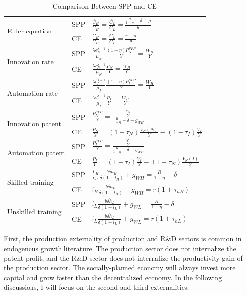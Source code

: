 \documentclass[12pt]{article}
\begin{document}
\begin{table}[h!]
\center
\renewcommand{\arraystretch}{2}
\begin{tabular}{l|ll}
\hline \hline
\multirow{2}{*}{Euler equation} & SPP  &  
$\frac{\dot{C_H}}{C_H} = \frac{\dot{C_L}}{C_L} = \frac{\frac{R}{1-\eta}-\delta-\rho}{\theta}$ \\
& CE &$\frac{\dot{C_H}}{C_H} = \frac{\dot{C_L}}{C_L} = \frac{r-\rho}{\theta}$ \\\hline
\multirow{2}{*}{Innovation rate} & SPP  &  
$\frac{\lambda\epsilon_N^{\lambda-1}}{\mu_N}\frac{(1-\eta)P_N^{SPP}}{Y} = \frac{W_H}{Y} $  \\ 
& CE &$\frac{\lambda\epsilon_N^{\lambda-1}}{\mu_N}\frac{P_N}{Y}  = \frac{W_H}{Y}$ \\\hline
\multirow{2}{*}{Automation rate}  & SPP  &  
$ \frac{\lambda\epsilon_I^{\lambda-1}}{\mu_I}\frac{(1-\eta)P_I^{SPP}}{Y}  = \frac{W_H}{Y}$  \\
& CE &$ \frac{\lambda\epsilon_I^{\lambda-1}}{\mu_I}\frac{P_I}{Y}  = \frac{W_H}{Y}$ \\\hline
\multirow{2}{*}{Innovation patent} & SPP  &  
$\frac{P_N^{SPP}}{Y} = \frac{\frac{Y_N}{Y}}{\frac{R}{1-\eta}-\delta-g_{WH}}$  \\
& CE &$\frac{P_N}{Y} =(1-\tau_N)\frac{V_N(N)}{Y}-(1-\tau_I)\frac{V_I}{Y}$ \\\hline
\multirow{2}{*}{Automation patent} & SPP  &  
$\frac{P_I^{SPP}}{Y}= \frac{\frac{Y_I}{Y}}{\frac{R}{1-\eta}-\delta-g_{WH}}$  \\
& CE &$\frac{P_I}{Y}  =  (1-\tau_I)\frac{V_I}{Y}-(1-\tau_N)\frac{V_N(I)}{Y}$ \\\hline
\multirow{2}{*}{Skilled training} & SPP  &  
$\frac{L_H}{\epsilon_H}\frac{b\delta \dot{h}_H}{\delta(1-l_H)}+g_{WH} = \frac{R}{1-\eta}-\delta$  \\ 
& CE &$l_H\frac{b\delta \dot{h}_H}{\delta(1-l_H)}+g_{WH} =  r(1+\tau_{hH})$ \\\hline
\multirow{2}{*}{Unskilled training} & SPP  &  
$l_L\frac{b\delta \dot{h}_L}{\delta(1-l_L)}+g_{WL}= \frac{R}{1-\eta}-\delta$  \\ 
& CE &$l_L\frac{b\delta \dot{h}_L}{\delta(1-l_L)}+g_{WL}=  r(1+\tau_{hL})$ \\\hline
\end{tabular}
\renewcommand{\arraystretch}{1}
\caption{Comparison Between SPP and CE}
\label{SPP_CE}
\end{table}

First, the production externality of production and R\&D sectors is common in endogenous growth literature. The production sector does not internalize the patent profit, and the R\&D sector does not internalize the productivity gain of the production sector. The socially-planned economy will always invest more capital and grow faster than the decentralized economy. In the following discussions, I will focus on the second and third externalities.
\end{document}
